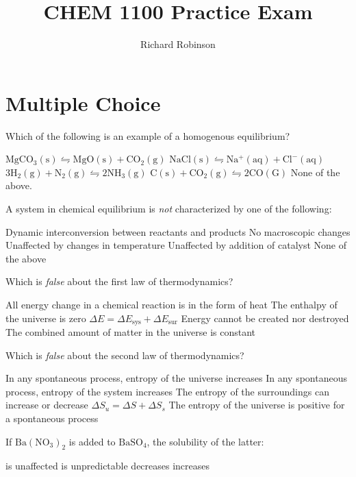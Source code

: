 \documentclass[answers]{exam}
\title{CHEM 1100 Practice Exam}
\author{Richard Robinson}
\begin{document}
\maketitle

\section{Multiple Choice}
\begin{multicols}{2}
\begin{questions}

\question Which of the following is an example of a homogenous equilibrium?

\begin{choices}
 \choice $\mathrm{MgCO_3(s) \leftrightharpoons MgO(s) + CO_2(g)}$
 \choice $\mathrm{NaCl(s) \leftrightharpoons Na^+(aq) + Cl^-(aq)}$
 \CorrectChoice $\mathrm{3H_2(g) + N_2(g) \leftrightharpoons 2NH_3(g)}$
 \choice $\mathrm{C(s) + CO_2(g) \leftrightharpoons 2CO(G)}$
 \choice None of the above.
\end{choices}

\question A system in chemical equilibrium is \emph{not} characterized by one of the following:

\begin{choices}
  \choice Dynamic interconversion between reactants and products
  \choice No macroscopic changes
  \CorrectChoice Unaffected by changes in temperature
  \choice Unaffected by addition of catalyst
  \choice None of the above
\end{choices}

\question Which is \emph{false} about the first law of thermodynamics?

\begin{choices}
  \choice All energy change in a chemical reaction is in the form of heat
  \choice The enthalpy of the universe is zero
  \choice $\Delta E = \Delta E_\text{sys} + \Delta E_{\text{sur}}$
  \choice Energy cannot be created nor destroyed
  \choice The combined amount of matter in the universe is constant
\end{choices}

\question Which is \emph{false} about the second law of thermodynamics?

\begin{choices}
  \choice In any spontaneous process, entropy of the universe increases
  \choice In any spontaneous process, entropy of the system increases
  \choice The entropy of the surroundings can increase or decrease
  \choice $\Delta S_u = \Delta S + \Delta S_s$
  \choice The entropy of the universe is positive for a spontaneous process
\end{choices}

\question If $\mathrm{Ba(NO_3)_2}$ is added to $\mathrm{BaSO_4}$, the solubility of the latter:

\begin{choices}
  \choice is unaffected
  \choice is unpredictable
  \choice decreases
  \choice increases
\end{choices}

\end{questions}
\end{multicols}
\end{document}
